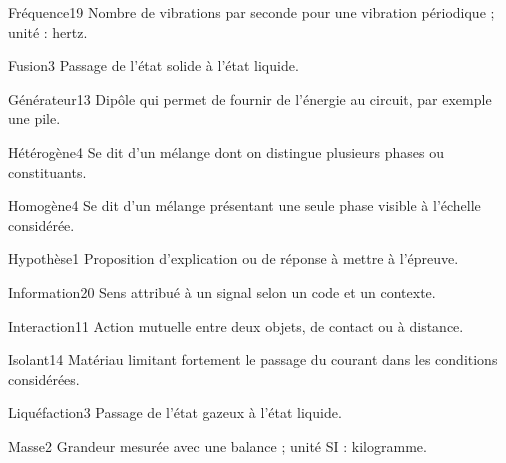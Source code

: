 \documentclass[12pt,twoside,openany]{book}
\begin{document}
\begin{pcLexique}{Fréquence}{19}
Nombre de vibrations par seconde pour une vibration périodique ; unité : hertz.\par
\end{pcLexique}
\begin{pcLexique}{Fusion}{3}
Passage de l’état solide à l’état liquide.\par
\end{pcLexique}
\begin{pcLexique}{Générateur}{13}
Dipôle qui permet de fournir de l’énergie au circuit, par exemple une pile.\par
\end{pcLexique}
\begin{pcLexique}{Hétérogène}{4}
Se dit d’un mélange dont on distingue plusieurs phases ou constituants.\par
\end{pcLexique}
\begin{pcLexique}{Homogène}{4}
Se dit d’un mélange présentant une seule phase visible à l’échelle considérée.\par
\end{pcLexique}
\begin{pcLexique}{Hypothèse}{1}
Proposition d’explication ou de réponse à mettre à l’épreuve.\par
\end{pcLexique}
\begin{pcLexique}{Information}{20}
Sens attribué à un signal selon un code et un contexte.\par
\end{pcLexique}
\begin{pcLexique}{Interaction}{11}
Action mutuelle entre deux objets, de contact ou à distance.\par
\end{pcLexique}
\begin{pcLexique}{Isolant}{14}
Matériau limitant fortement le passage du courant dans les conditions considérées.\par
\end{pcLexique}
\begin{pcLexique}{Liquéfaction}{3}
Passage de l’état gazeux à l’état liquide.\par
\end{pcLexique}
\begin{pcLexique}{Masse}{2}
Grandeur mesurée avec une balance ; unité SI : kilogramme.\par
\end{pcLexique}
\end{document}
